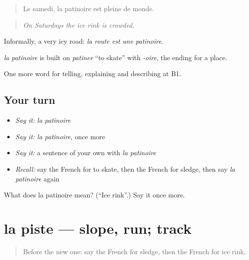 \begin{quote}
Le samedi, la patinoire est pleine de monde.
\end{quote}

\begin{quote}
\emph{On Saturdays the ice rink is crowded.}
\end{quote}

Informally, a very icy road: \emph{la route est une patinoire}.

\begin{cousinweb}
\emph{la patinoire} is built on \emph{patiner} \textquotedblleft{}to skate\textquotedblright{} with \emph{-oire}, the ending for a place.
\end{cousinweb}

\begin{grammarlens}[title={What you've built}]
One more word for telling, explaining and describing at B1.
\end{grammarlens}

\subsection*{Your turn}
\begin{itemize}
\raggedright
  \item \emph{Say it:} \emph{la patinoire}
  \item \emph{Say it:} \emph{la patinoire}, once more
  \item \emph{Say it:} a sentence of your own with \emph{la patinoire}
  \item \emph{Recall:} say the French for to skate, then the French for sledge, then say \emph{la patinoire} again
\end{itemize}

\begin{tcolorbox}[breakable,colback=teal!4,colframe=teal!35!black,title={Before you move on}]
What does la patinoire mean? (\textquotedblleft{}Ice rink\textquotedblright{}.) Say it once more.
\end{tcolorbox}
\section[la piste]{la piste — slope, run; track}

\label{lesson:FR-C510-piste}



\begin{quote}
Before the new one: say the French for sledge, then the French for ice rink.
\end{quote}

